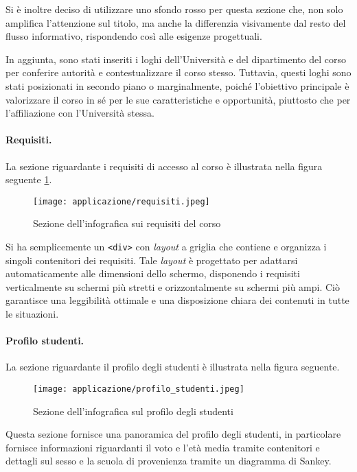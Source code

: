 Si è inoltre deciso di utilizzare uno sfondo rosso per questa sezione che, non solo amplifica l'attenzione sul titolo, ma anche la differenzia
visivamente dal resto del flusso informativo, rispondendo così alle esigenze progettuali.
 
In aggiunta, sono stati inseriti i loghi dell'Università e del dipartimento del corso per conferire autorità e contestualizzare il corso stesso. 
Tuttavia, questi loghi sono stati posizionati in secondo piano o marginalmente, poiché l'obiettivo principale è valorizzare il corso in sé per le sue caratteristiche e opportunità, 
piuttosto che per l'affiliazione con l'Università stessa.

\paragraph{Requisiti.} La sezione riguardante i requisiti di accesso al corso è illustrata nella figura seguente \ref{fig:requisiti}.
\begin{figure}[H] 
    \centering 
    \texttt{[image: applicazione/requisiti.jpeg]} 
    \caption{Sezione dell'infografica sui requisiti del corso}
    \label{fig:requisiti}
\end{figure}
\noindent Si ha semplicemente un \texttt{<div>} con \emph{layout} a griglia che contiene e organizza i singoli contenitori dei requisiti.
Tale \emph{layout} è progettato per adattarsi automaticamente alle dimensioni dello schermo, disponendo i requisiti verticalmente su schermi 
più stretti e orizzontalmente su schermi più ampi. Ciò garantisce una leggibilità ottimale e una disposizione 
chiara dei contenuti in tutte le situazioni.

\paragraph{Profilo studenti.} La sezione riguardante il profilo degli studenti è illustrata nella figura seguente. 
\begin{figure}[H] 
    \centering 
    \texttt{[image: applicazione/profilo\_studenti.jpeg]} 
    \caption{Sezione dell'infografica sul profilo degli studenti}
    \label{fig:app_profilo_stud}
\end{figure}
\noindent Questa sezione fornisce una panoramica del profilo degli studenti, in particolare fornisce informazioni riguardanti il voto e l'età media 
tramite contenitori e dettagli sul sesso e la scuola di provenienza tramite un diagramma di Sankey.

